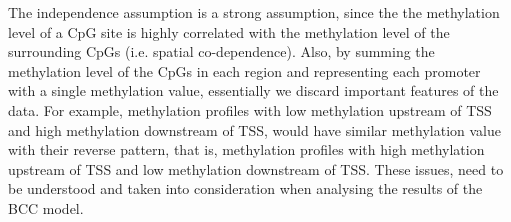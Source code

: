 The independence assumption is a strong assumption, since the the methylation level of a CpG site is highly correlated with the methylation level of the surrounding CpGs (i.e. spatial co-dependence). Also, by summing the methylation level of the CpGs in each region and representing each promoter with a single methylation value, essentially we discard  important features of the data. For example, methylation profiles with low methylation upstream of TSS and high methylation downstream of TSS, would have similar methylation value with their reverse pattern, that is, methylation profiles with high methylation upstream of TSS and low methylation downstream of TSS. These issues, need to be understood and taken into consideration when analysing the results of the BCC model.

